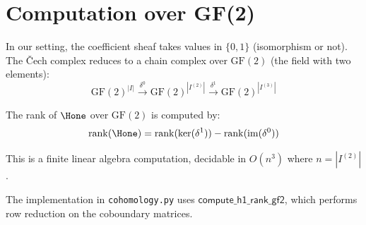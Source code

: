 \section{Computation over GF(2)}

In our setting, the coefficient sheaf takes values in $\{0, 1\}$
(isomorphism or not).  The \v{C}ech complex reduces to a chain
complex over $\mathrm{GF}(2)$ (the field with two elements):
\[
  \mathrm{GF}(2)^{|I|} \xrightarrow{\delta^0}
  \mathrm{GF}(2)^{|I^{(2)}|} \xrightarrow{\delta^1}
  \mathrm{GF}(2)^{|I^{(3)}|}
\]

The rank of $\Hone$ over $\mathrm{GF}(2)$ is computed by:
\[
  \mathrm{rank}(\Hone) = \mathrm{rank}(\ker(\delta^1)) -
    \mathrm{rank}(\mathrm{im}(\delta^0))
\]

This is a finite linear algebra computation, decidable in
$O(n^3)$ where $n = |I^{(2)}|$.

The implementation in \texttt{cohomology.py} uses
$\mathsf{compute\_h1\_rank\_gf2}$, which performs row reduction
on the coboundary matrices.


